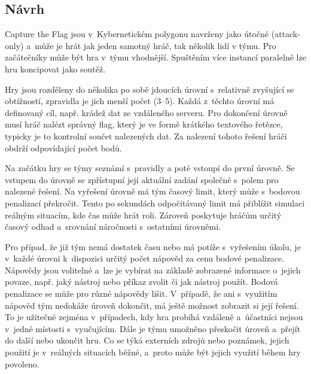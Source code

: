 \documentclass[
  digital, %
  oneside, %
  table,   %
  nolof,     %
  nolot,     %
]{fithesis3}
\begin{document}
\subsection{Návrh} \label{gameDesign}
Capture the Flag jsou v~Kybernetickém polygonu navrženy jako útočné (attack-only) a~může je hrát jak jeden samotný hráč, tak několik lidí v týmu. Pro začátečníky může být hra v~týmu vhodnější. Spuštěním více instancí paralelně lze hru koncipovat jako soutěž.\par
Hry jsou rozděleny do několika po sobě jdoucích úrovní s~relativně zvyšující se obtížností, zpravidla je jich menší počet (3–5). Každá z~těchto úrovní má definovaný cíl, např. krádež dat ze vzdáleného serveru. Pro dokončení úrovně musí hráč nalézt správný flag, který je ve formě krátkého textového řetězce, typicky je to kontrolní součet nalezených dat. Za nalezení tohoto řešení hráči obdrží odpovídající počet bodů.\par
Na začátku hry se týmy seznámí s~pravidly a poté vstoupí do první úrovně. Se vstupem do úrovně se zpřístupní její aktuální zadání společně s~polem pro nalezené řešení. Na vyřešení úrovně má tým časový limit, který může s~bodovou penalizací překročit. Tento po sekundách odpočítávaný limit má přiblížit simulaci reálným situacím, kde čas může hrát roli. Zároveň poskytuje hráčům určitý časový odhad a~srovnání náročnosti s~ostatními úrovněmi.\par
Pro případ, že již tým nemá dostatek času nebo má potíže s~vyřešením úkolu, je v~každé úrovni k~dispozici určitý počet nápověd za cenu bodové penalizace. Nápovědy jsou volitelné a~lze je vybírat na základě zobrazené informace o~jejich povaze, např. jaký nástroj nebo příkaz zvolit či jak nástroj použít. Bodová penalizace se může pro různé nápovědy lišit. V~případě, že ani s~využitím nápověd tým nedokáže úroveň dokončit, má ještě možnost zobrazit si její řešení. To je užitečné zejména v~případech, kdy hra probíhá vzdáleně a~účastníci nejsou v~jedné místosti s~vyučujícím. Dále je týmu umožněno přeskočit úroveň a~přejít do další nebo ukončit hru. Co se týká externích zdrojů nebo poznámek, jejich použití je v~reálných situacích běžné, a~proto může být jejich využití během hry povoleno. \cite{ctfDesign}\par
\end{document}
